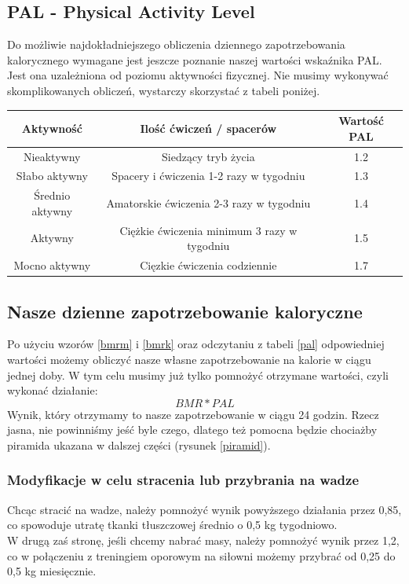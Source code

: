 \documentclass{article}
\begin{document}
\subsection{PAL - Physical Activity Level}
Do możliwie najdokładniejszego obliczenia dziennego zapotrzebowania kalorycznego wymagane jest jeszcze poznanie naszej wartości wskaźnika PAL. Jest ona uzależniona od poziomu aktywności fizycznej. Nie musimy wykonywać skomplikowanych obliczeń, wystarczy skorzystać z tabeli poniżej.

\begin{center}
\begin{tabular}{|c|c|c|}
\hline
Aktywność & Ilość ćwiczeń / spacerów & Wartość PAL \\
\hline \hline 
Nieaktywny & Siedzący tryb życia & 1.2 \\ 
\hline 
Słabo aktywny & Spacery i ćwiczenia 1-2 razy w tygodniu & 1.3 \\ 
\hline 
Średnio aktywny & Amatorskie ćwiczenia 2-3 razy w tygodniu & 1.4 \\
\hline
Aktywny & Ciężkie ćwiczenia minimum 3 razy w tygodniu & 1.5 \\
\hline
Mocno aktywny & Cięzkie ćwiczenia codziennie & 1.7 \\
\hline
\end{tabular} \label{pal}
\end{center}

\subsection{Nasze dzienne zapotrzebowanie kaloryczne}
Po użyciu wzorów \ref{bmrm} i \ref{bmrk} oraz odczytaniu z tabeli \ref{pal} odpowiedniej wartości możemy obliczyć nasze własne zapotrzebowanie na kalorie w ciągu jednej doby. W tym celu musimy już tylko pomnożyć otrzymane wartości, czyli wykonać działanie:
$$BMR * PAL$$
Wynik, który otrzymamy to nasze zapotrzebowanie w ciągu 24 godzin. Rzecz jasna, nie powinniśmy jeść byle czego, dlatego też pomocna będzie chociażby piramida ukazana w dalszej części (rysunek \ref{piramid}).

\subsubsection{Modyfikacje w celu stracenia lub przybrania na wadze}
Chcąc stracić na wadze, należy pomnożyć wynik powyższego działania przez 0,85, co spowoduje utratę tkanki tłuszczowej średnio o 0,5 kg tygodniowo. \\
W drugą zaś stronę, jeśli chcemy nabrać masy, należy pomnożyć wynik przez 1,2, co w połączeniu z treningiem oporowym na siłowni możemy przybrać od 0,25 do 0,5 kg miesięcznie.
\end{document}

